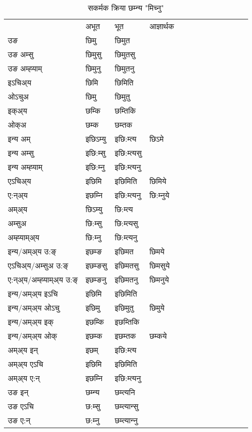 \begin{table}[H]
\centering
\caption{\label{im.vt} सकर्मक क्रिया  छम्‍न्य  "मिच्नु"  }
\begin{tabular}{l|l|l|l|l|l|l|l|l|l|l|l|l}  \toprule
&अभूत & भूत & आज्ञार्थक \\ 
उङ &छिमु &छिमुत \\ 
उङ अम्सु &छिमुसु &छिमुतसु \\ 
उङ अम्ह्‍याम् &छिमुनु &छिमुतनु \\ 
इऽचिअ्य &छिमि &छिमिति   \\ 
ओऽचुअ &छिमु &छिमुतु   \\ 
इक्अ्य &छम्कि &छम्तिकि   \\ 
ओक्अ &छम्क &छम्तक   \\ 
इन्य अम् & इछिऽम्यु  & इछि:म्त्य &छिऽमे  \\ 
इन्य अम्सु & इछि:म्सु  & इछि:म्त्यसु   \\ 
इन्य अम्ह्‍याम् & इछि:म्‍नु  & इछि:म्त्यनु   \\ 
एऽचिअ्य & इछिमि & इछिमिति &छिमिये    \\ 
ए:न्अ्य & इछम्‍नि  & इछि:म्त्यनु &छि:म्‍नुये  \\ 
अम्अ्य & छिऽम्यु  & छि:म्त्य  \\ 
अम्सुअ & छि:म्सु & छि:म्त्यसु  \\ 
अम्ह्‍याम्अ्य & छि:म्‍नु  & छि:म्त्यनु \\ 
\midrule
इन्य/अम्अ्य उ:ङ्‌&इछम्ङ & इछिमत &छिमये \\ 
एऽचिअ्य/अम्सुअ उ:ङ्‌ &इछम्ङसु & इछिमतसु &छिमसुये \\ 
ए:न्अ्य/अम्ह्‍याम्अ्य उ:ङ्‌ &इछम्ङनु & इछिमतनु &छिमनुये \\ 
इन्य/अम्अ्य इऽचि & इछिमि & इछिमिति    \\ 
इन्य/अम्अ्य ओऽचु & इछिमु & इछिमुतु  &छिमुये  \\ 
इन्य/अम्अ्य इक् & इछम्कि & इछम्तिकि   \\ 
इन्य/अम्अ्य ओक् & इछम्क & इछम्तक  &छम्कये  \\ 
अम्अ्य इन् & इछम् & इछि:म्त्य   \\ 
अम्अ्य एऽचि & इछिमि & इछिमिति    \\ 
अम्अ्य ए:न् & इछम्‍नि  & इछि:म्त्यनु  \\ 
\midrule
उङ इन् & छम्‍न्य  & छम्त्यनि  \\ 
उङ एऽचि & छ:म्सु  & छम्त्यान्सु   \\ 
उङ ए:न्& छ:म्‍नु  & छम्त्यान्‍नु   \\ 
\bottomrule
\end{tabular}
\end{table}


